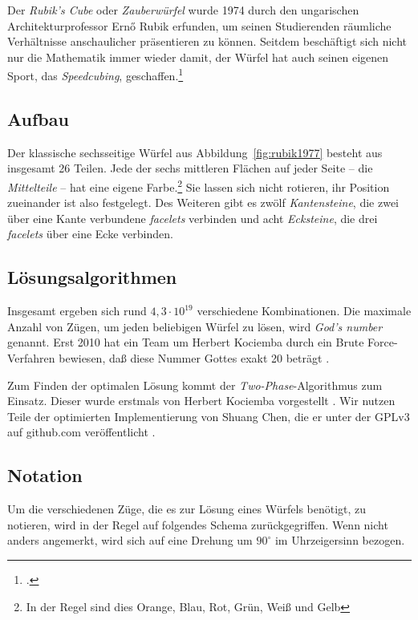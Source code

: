 Der \emph{Rubik's Cube} oder \emph{Zauberwürfel} wurde 1974 durch den
ungarischen Architekturprofessor Ernő Rubik erfunden, um seinen Studierenden
räumliche Verhältnisse anschaulicher präsentieren zu können. Seitdem beschäftigt
sich nicht nur die Mathematik immer wieder damit, der Würfel hat auch seinen
eigenen Sport, das \emph{Speedcubing}, geschaffen.\footcite{rubik:history} 

\subsection{Aufbau}  %

Der klassische sechsseitige Würfel aus Abbildung~\ref{fig:rubik1977} besteht aus
insgesamt 26 Teilen. Jede der sechs mittleren Flächen auf jeder Seite – die
\emph{Mittelteile} – hat eine eigene Farbe.\footnote{In der Regel sind dies
Orange, Blau, Rot, Grün, Weiß und Gelb} Sie lassen sich nicht rotieren, ihr
Position zueinander ist also festgelegt. Des Weiteren gibt es zwölf
\emph{Kantensteine}, die zwei über eine Kante verbundene \emph{facelets}
verbinden und acht \emph{Ecksteine}, die drei \emph{facelets} über eine Ecke
verbinden.

\subsection{Lösungsalgorithmen}  %

Insgesamt ergeben sich rund \( 4,3 \cdot {10}^{19} \) verschiedene
Kombinationen. Die maximale Anzahl von Zügen, um jeden beliebigen Würfel zu
lösen, wird \emph{God's number} genannt. Erst 2010 hat ein Team um Herbert
Kociemba durch ein Brute Force-Verfahren bewiesen, daß diese Nummer Gottes exakt
20 beträgt \citep{rubik:godsnumber}.

Zum Finden der optimalen Lösung kommt der \emph{Two-Phase}-Algorithmus zum
Einsatz. Dieser wurde erstmals von Herbert Kociemba vorgestellt
\citep{rubik:kociemba}. Wir nutzen Teile der optimierten Implementierung
von Shuang Chen, die er unter der GPLv3 auf github.com veröffentlicht
\citep{rubik:chen}.

\subsection{Notation}  %

Um die verschiedenen Züge, die es zur Lösung eines Würfels benötigt, zu
notieren, wird in der Regel auf folgendes Schema zurückgegriffen. Wenn nicht
anders angemerkt, wird sich auf eine Drehung um $90^\circ$ im Uhrzeigersinn
bezogen.

